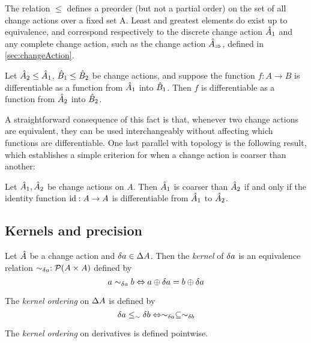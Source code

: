 The relation $\leq$  defines a preorder (but not a partial order) on the set of all change actions 
over a fixed set A. Least and greatest elements do exist up to equivalence, and correspond
respectively to the discrete change action $\hat{A}_1$ and any complete change
action, such as the change action $\hat{A}_\Rightarrow$,
defined in \cref{sec:changeAction}.

\begin{prop}
  Let $\hat{A}_2 \leq \hat{A}_1$, $\hat{B}_1 \leq \hat{B}_2$ be change actions, and suppose
  the function $f : A \rightarrow B$ is differentiable as a function from $\hat{A}_1$ into
  $\hat{B}_1$. Then $f$ is differentiable as a function from $\hat{A}_2$ into $\hat{B}_2$.
\end{prop}

A straightforward consequence of this fact is that, whenever two change actions are equivalent,
they can be used interchangeably without affecting which functions are differentiable. One last parallel with topology
is the following result, which establishes a simple criterion for when a change action is coarser than
another:

\begin{prop}
  Let $\hat{A}_1, \hat{A}_2$ be change actions on $A$. Then $\hat{A}_1$ is coarser than $\hat{A}_2$
  if and only if the identity function $\operatorname{id} : A \rightarrow A$ is differentiable from $\hat{A}_1$ to
  $\hat{A}_2$.
\end{prop}

\subsection{Kernels and precision}

\begin{defn}[Kernel]
  Let $\hat{A}$ be a change action and $\delta a \in \Delta A$. Then the
  \emph{kernel} of $\delta a$ is an equivalence relation $\sim_{\delta a}
  : \mathcal{P}(A \times A)$ defined by
  \begin{displaymath}
    a \sim_{\delta a} b \Leftrightarrow a \oplus \delta a = b \oplus \delta a
  \end{displaymath}

  The \emph{kernel ordering} on $\Delta A$ is defined by
  \begin{displaymath}
    \delta a \leq_\sim \delta b \Leftrightarrow \sim_{\delta a} \subseteq \sim_{\delta b}
  \end{displaymath}

  The \emph{kernel ordering} on derivatives is defined pointwise.
\end{defn}

